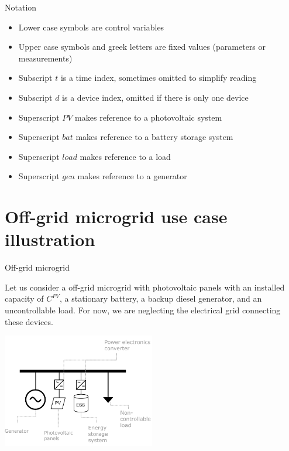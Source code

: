\begin{frame}{Notation}
\begin{itemize}
    \item Lower case symbols are control variables
    \item Upper case symbols and greek letters are fixed values (parameters or measurements)
    \item Subscript $t$ is a time index, sometimes omitted to simplify reading
    \item Subscript $d$ is a device index, omitted if there is only one device
    \item Superscript $PV$ makes reference to a photovoltaic system
    \item Superscript $bat$ makes reference to a battery storage system
    \item Superscript $load$ makes reference to a load
    \item Superscript $gen$ makes reference to a generator
\end{itemize}
    

\end{frame}


\section{Off-grid microgrid use case illustration}
\begin{frame}{Off-grid microgrid}
    \begin{multicols}{2}
        
    
    Let us consider a off-grid microgrid with photovoltaic panels with an installed capacity of $C^{PV}$, a stationary battery, a backup diesel generator, and an uncontrollable load. For now, we are neglecting the electrical grid connecting these devices.

    \begin{center}
    \includegraphics[width=0.5\textwidth]{images/off_grid_1.pdf}        
    \end{center}
\end{multicols}
\end{frame}

